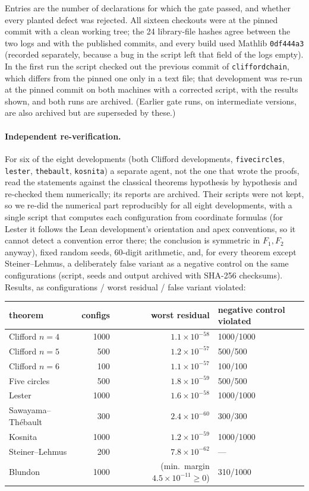 \documentclass[11pt]{article}
\theoremstyle{definition}
\theoremstyle{remark}
\newcommand{\lean}[1]{\texttt{#1}}
\begin{document}
Entries are the number of declarations for which the gate passed, and whether every planted defect was
rejected. All sixteen checkouts were at the pinned commit with a clean working tree; the 24 library-file hashes
agree between the two logs and with the published commits, and every build used Mathlib
\texttt{0df444a3} (recorded separately, because a bug in the script left that field of the logs
empty). In the first run the script checked out the previous commit of \lean{cliffordchain}, which
differs from the pinned one only in a text file; that development was re-run at the pinned commit on
both machines with a corrected script, with the results shown, and both runs are archived. (Earlier gate runs, on intermediate versions, are also archived but are superseded by these.)

\paragraph{Independent re-verification.} For six of the eight developments (both Clifford
developments, \lean{fivecircles}, \lean{lester}, \lean{thebault}, \lean{kosnita}) a separate agent, not
the one that wrote the proofs, read the statements against the classical theorems hypothesis by
hypothesis and re-checked them numerically; its reports are archived. Their scripts were not kept, so
we re-did the numerical part reproducibly for all eight developments, with a single script that computes each configuration from coordinate formulas (for Lester it
follows the Lean development's orientation and apex conventions, so it cannot detect a convention
error there; the conclusion is symmetric in $F_1,F_2$ anyway), fixed random seeds, 60-digit
arithmetic, and, for every theorem except Steiner--Lehmus, a deliberately false variant as a negative
control on the same configurations (script,
seeds and output archived with SHA-256 checksums). Results, as configurations / worst residual /
false variant violated:
\begin{center}\small
\begin{tabular}{lrrl}
\toprule
theorem & configs & worst residual & negative control violated\\
\midrule
Clifford $n=4$ & 1000 & $1.1\times10^{-58}$ & 1000/1000\\
Clifford $n=5$ & 500 & $1.2\times10^{-57}$ & 500/500\\
Clifford $n=6$ & 100 & $1.1\times10^{-57}$ & 100/100\\
Five circles & 500 & $1.8\times10^{-59}$ & 500/500\\
Lester & 1000 & $1.6\times10^{-58}$ & 1000/1000\\
Sawayama--Th\'ebault & 300 & $2.4\times10^{-60}$ & 300/300\\
Kosnita & 1000 & $1.2\times10^{-59}$ & 1000/1000\\
Steiner--Lehmus & 200 & $7.8\times10^{-62}$ & ---\\
Blundon & 1000 & (min.\ margin $4.5\times10^{-11}\ge0$) & 310/1000\\
\bottomrule
\end{tabular}
\end{center}
\end{document}
